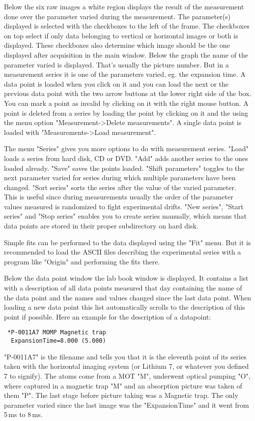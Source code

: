\documentclass[10pt]{article}
\begin{document}
Below the six raw images a white region displays the result of the
measurement done over the parameter varied during the measurement.
The parameter(s) displayed is selected with the checkboxes to the
left of the frame. The checkboxes on top select if only data
belonging to vertical or horizontal images or both is displayed.
These checkboxes also determine which image should be the one
displayed after acquisition in the main window. Below the graph
the name of the parameter varied is displayed. That's usually the
picture number. But in a measurement series it is one of the
parameters varied, eg. the expansion time. A data point is loaded
when you click on it and you can load the next or the previous
data point with the two arrow buttons at the lower right side of
the box. You can mark a point as invalid by clicking on it with
the right mouse button. A point is deleted from a series by
loading the point by clicking on it and the using the menu option
"Measurement->Delete measurements". A single data point is loaded
with "Measurements->Load measurement".

The menu "Series" gives you more options to do with measurement
series. "Load" loads a series from hard disk, CD or DVD. "Add"
adds another series to the ones loaded already. "Save" saves the
points loaded. "Shift parameters" toggles to the next parameter
varied for series during which multiple parameters have been
changed. "Sort series" sorts the series after the value of the
varied parameter. This is useful since during measurements usually
the order of the parameter values measured is randomized to fight
experimental drifts. "New series", "Start series" and "Stop
series" enables you to create series manually, which means that
data points are stored in their proper subdirectory on hard disk.

Simple fits can be performed to the data displayed using the "Fit"
menu. But it is recommended to load the ASCII files describing the
experimental series with a program like "Origin" and performing
the fits there.

Below the data point window the lab book window is displayed. It
contains a list with a description of all data points measured
that day containing the name of the data point and the names and
values changed since the last data point. When loading a new data
point this list automatically scrolls to the description of this
point if possible. Here an example for the description of a
datapoint:
\begin{verbatim}
 *P-0011A7 MOMP Magnetic trap
  ExpansionTime=8.000 (5.000)
\end{verbatim}
"P-0011A7" is the filename and tells you that it is the eleventh
point of its series taken with the horizontal imaging system (or
Lithium 7, or whatever you defined 7 to signify). The atoms come
from a MOT "M", underwent optical pumping "O", where captured in a
magnetic trap "M" and an absorption picture was taken of them "P".
The last stage before picture taking was a Magnetic trap. The only
parameter varied since the last image was the "ExpansionTime" and
it went from 5\,ms to 8\,ms.
\end{document}
